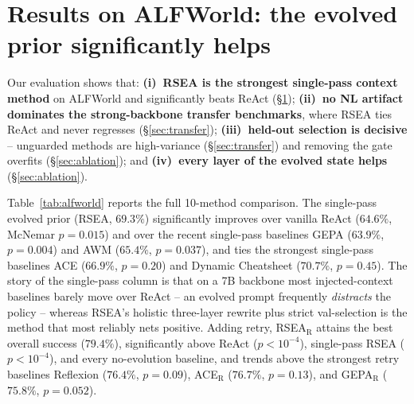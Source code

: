 \documentclass{article}
\begin{document}
\section{Results on ALFWorld: the evolved prior significantly helps}
\label{sec:alfworld}
Our evaluation shows that: \textbf{(i)~RSEA is the strongest single-pass context
method} on ALFWorld and significantly beats ReAct (\S\ref{sec:alfworld});
\textbf{(ii)~no NL artifact dominates the strong-backbone transfer benchmarks}, where
RSEA ties ReAct and never regresses (\S\ref{sec:transfer}); \textbf{(iii)~held-out
selection is decisive} -- unguarded methods are high-variance (\S\ref{sec:transfer})
and removing the gate overfits (\S\ref{sec:ablation}); and \textbf{(iv)~every layer
of the evolved state helps} (\S\ref{sec:ablation}).

Table~\ref{tab:alfworld} reports the full 10-method comparison. The single-pass
evolved prior (RSEA, $69.3\%$) significantly improves over vanilla ReAct ($64.6\%$,
McNemar $p{=}0.015$) and over the recent single-pass baselines GEPA ($63.9\%$,
$p{=}0.004$) and AWM ($65.4\%$, $p{=}0.037$), and ties the strongest single-pass
baselines ACE ($66.9\%$, $p{=}0.20$) and Dynamic Cheatsheet ($70.7\%$, $p{=}0.45$).
The story of the single-pass column is that on a 7B backbone most injected-context
baselines barely move over ReAct -- an evolved prompt frequently \emph{distracts} the
policy -- whereas RSEA's holistic three-layer rewrite plus strict val-selection is the
method that most reliably nets positive. Adding retry, RSEA$_\text{R}$ attains the
best overall success ($79.4\%$), significantly above ReAct ($p{<}10^{-4}$),
single-pass RSEA ($p{<}10^{-4}$), and every no-evolution baseline, and trends above
the strongest retry baselines Reflexion ($76.4\%$, $p{=}0.09$), ACE$_\text{R}$
($76.7\%$, $p{=}0.13$), and GEPA$_\text{R}$ ($75.8\%$, $p{=}0.052$).
\end{document}
